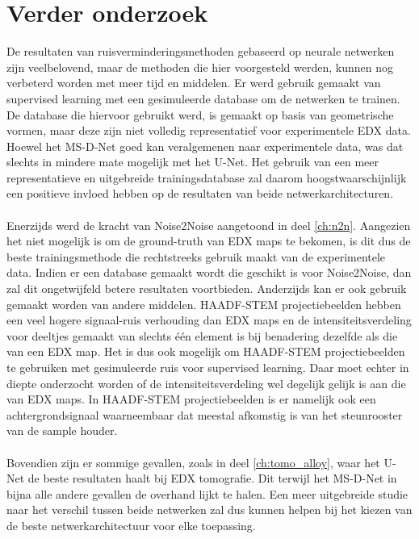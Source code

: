 \documentclass{report}
\begin{document}
\section{Verder onderzoek}
De resultaten van ruisverminderingsmethoden gebaseerd op neurale netwerken zijn veelbelovend, maar de methoden die hier voorgesteld werden, kunnen nog verbeterd worden met meer tijd en middelen. Er werd gebruik gemaakt van supervised learning met een gesimuleerde database om de netwerken te trainen. De database die hiervoor gebruikt werd, is gemaakt op basis van geometrische vormen, maar deze zijn niet volledig representatief voor experimentele EDX data. Hoewel het MS-D-Net goed kan veralgemenen naar experimentele data, was dat slechts in mindere mate mogelijk met het U-Net. Het gebruik van een meer representatieve en uitgebreide trainingsdatabase zal daarom hoogstwaarschijnlijk een positieve invloed hebben op de resultaten van beide netwerkarchitecturen.
\\ \\
Enerzijds werd de kracht van Noise2Noise aangetoond in deel \ref{ch:n2n}. Aangezien het niet mogelijk is om de ground-truth van EDX maps te bekomen, is dit dus de beste trainingsmethode die rechtstreeks gebruik maakt van de experimentele data. Indien er een database gemaakt wordt die geschikt is voor Noise2Noise, dan zal dit ongetwijfeld betere resultaten voortbieden. Anderzijds kan er ook gebruik gemaakt worden van andere middelen. HAADF-STEM projectiebeelden hebben een veel hogere signaal-ruis verhouding dan EDX maps en de intensiteitsverdeling voor deeltjes gemaakt van slechts één element is bij benadering dezelfde als die van een EDX map. Het is dus ook mogelijk om HAADF-STEM projectiebeelden te gebruiken met gesimuleerde ruis voor supervised learning. Daar moet echter in diepte onderzocht worden of de intensiteitsverdeling wel degelijk gelijk is aan die van EDX maps. In HAADF-STEM projectiebeelden is er namelijk ook een achtergrondsignaal waarneembaar dat meestal afkomstig is van het steunrooster van de sample houder.
\\ \\
Bovendien zijn er sommige gevallen, zoals in deel \ref{ch:tomo_alloy}, waar het U-Net de beste resultaten haalt bij EDX tomografie. Dit terwijl het MS-D-Net in bijna alle andere gevallen de overhand lijkt te halen. Een meer uitgebreide studie naar het verschil tussen beide netwerken zal dus kunnen helpen bij het kiezen van de beste netwerkarchitectuur voor elke toepassing.
\end{document}
